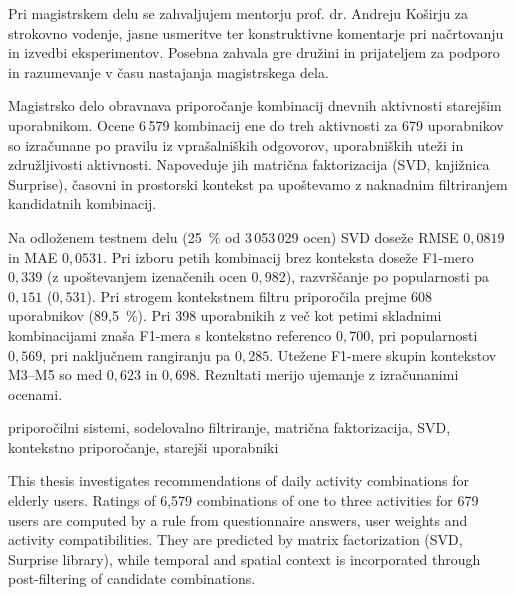 \documentclass[a4paper,twoside,openright,12pt,slovene]{book}
\date{Ljubljana, \the\year}
\begin{document}
\frontmatter


\maketitle

\zahvala
Pri magistrskem delu se zahvaljujem mentorju prof. dr. Andreju Koširju za strokovno vodenje, jasne usmeritve ter konstruktivne komentarje pri načrtovanju in izvedbi eksperimentov. Posebna zahvala gre družini in prijateljem za podporo in razumevanje v času nastajanja magistrskega dela.

\povzetek
Magistrsko delo obravnava priporočanje kombinacij dnevnih
aktivnosti starejšim uporabnikom. Ocene 6\,579 kombinacij ene do treh
aktivnosti za 679 uporabnikov so izračunane po pravilu iz vprašalniških
odgovorov, uporabniških uteži in združljivosti aktivnosti. Napoveduje jih
matrična faktorizacija (SVD, knjižnica Surprise), časovni in prostorski
kontekst pa upoštevamo z naknadnim filtriranjem kandidatnih kombinacij.

Na odloženem testnem delu (25~\% od 3\,053\,029 ocen) SVD doseže
RMSE $0{,}0819$ in MAE $0{,}0531$. Pri izboru petih kombinacij brez
konteksta doseže F1-mero $0{,}339$ (z upoštevanjem izenačenih ocen
$0{,}982$), razvrščanje po popularnosti pa $0{,}151$ ($0{,}531$).
Pri strogem kontekstnem filtru priporočila prejme 608 uporabnikov
(89,5~\%). Pri 398 uporabnikih z več kot petimi skladnimi kombinacijami
znaša F1-mera s kontekstno referenco $0{,}700$, pri popularnosti $0{,}569$,
pri naključnem rangiranju pa $0{,}285$. Utežene F1-mere skupin kontekstov
M3--M5 so med $0{,}623$ in $0{,}698$. Rezultati merijo ujemanje
z izračunanimi ocenami.


\kljucnebesede
priporočilni sistemi, sodelovalno filtriranje, matrična faktorizacija, SVD, kontekstno priporočanje, starejši uporabniki




\abstract
This thesis investigates recommendations of daily activity
combinations for elderly users. Ratings of 6,579 combinations of one to
three activities for 679 users are computed by a rule from questionnaire
answers, user weights and activity compatibilities. They are predicted by
matrix factorization (SVD, Surprise library), while temporal and spatial
context is incorporated through post-filtering of candidate combinations.
\end{document}
